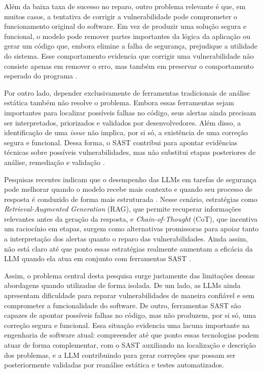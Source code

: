 Além da baixa taxa de sucesso no reparo, outro problema relevante é que, em muitos casos, a tentativa de corrigir a vulnerabilidade pode comprometer o funcionamento original do software. Em vez de produzir uma solução segura e funcional, o modelo pode remover partes importantes da lógica da aplicação ou gerar um código que, embora elimine a falha de segurança, prejudique a utilidade do sistema. Esse comportamento evidencia que corrigir uma vulnerabilidade não consiste apenas em remover o erro, mas também em preservar o comportamento esperado do programa \cite{dai_rethinking_2025}.

Por outro lado, depender exclusivamente de ferramentas tradicionais de análise estática também não resolve o problema. Embora essas ferramentas sejam importantes para localizar possíveis falhas no código, seus alertas ainda precisam ser interpretados, priorizados e validados por desenvolvedores. Além disso, a identificação de uma \textit{issue} não implica, por si só, a existência de uma correção segura e funcional. Dessa forma, o SAST contribui para apontar evidências técnicas sobre possíveis vulnerabilidades, mas não substitui etapas posteriores de análise, remediação e validação \cite{iranmanesh_zerofalse_2025}.


Pesquisas recentes indicam que o desempenho das LLMs em tarefas de segurança pode melhorar quando o modelo recebe mais contexto e quando seu processo de resposta é conduzido de forma mais estruturada \cite{tao_adapting_2025}. Nesse cenário, estratégias como \textit{Retrieval-Augmented Generation} (RAG), que permite recuperar informações relevantes antes da geração da resposta, e \textit{Chain-of-Thought} (CoT), que incentiva um raciocínio em etapas, surgem como alternativas promissoras para apoiar tanto a interpretação dos alertas quanto o reparo das vulnerabilidades. Ainda assim, não está claro até que ponto essas estratégias realmente aumentam a eficácia da LLM quando ela atua em conjunto com ferramentas SAST \cite{sriram_improving_2026}.

Assim, o problema central desta pesquisa surge justamente das limitações dessas abordagens quando utilizadas de forma isolada. De um lado, as LLMs ainda apresentam dificuldade para reparar vulnerabilidades de maneira confiável e sem comprometer a funcionalidade do software. De outro, ferramentas SAST são capazes de apontar possíveis falhas no código, mas não produzem, por si só, uma correção segura e funcional. Essa situação evidencia uma lacuna importante na engenharia de software atual: compreender até que ponto essas tecnologias podem atuar de forma complementar, com o SAST auxiliando na localização e descrição dos problemas, e a LLM contribuindo para gerar correções que possam ser posteriormente validadas por reanálise estática e testes automatizados.



